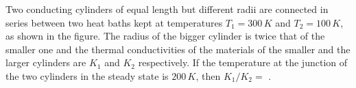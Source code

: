 
\item Two conducting cylinders of equal length but different radii are connected in series between two heat baths kept at temperatures \(T_1 = 300 \, K\) and \(T_2 = 100 \, K\), as shown in the figure. The radius of the bigger cylinder is twice that of the smaller one and the thermal conductivities of the materials of the smaller and the larger cylinders are \(K_1\) and \(K_2\) respectively. If the temperature at the junction of the two cylinders in the steady state is \(200 \, K\), then \(K_1/K_2 = \) \underline{\hspace{2cm}}.
\begin{center}
\end{center}
